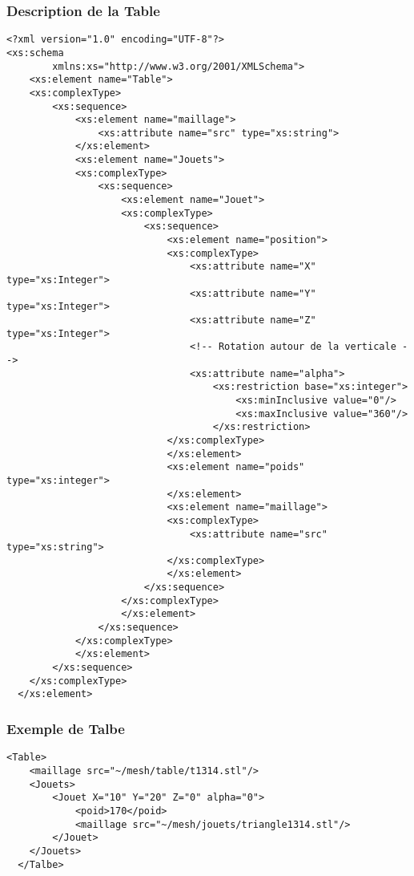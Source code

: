 \subsubsection{Description de la Table}
 \begin{lstlisting}[caption=Description de la Table, label=desctable]
<?xml version="1.0" encoding="UTF-8"?>
<xs:schema
        xmlns:xs="http://www.w3.org/2001/XMLSchema">
    <xs:element name="Table">
    <xs:complexType>
        <xs:sequence>
            <xs:element name="maillage">
                <xs:attribute name="src" type="xs:string">
            </xs:element>
            <xs:element name="Jouets">
            <xs:complexType>
                <xs:sequence>
                    <xs:element name="Jouet">
                    <xs:complexType>
                        <xs:sequence>
                            <xs:element name="position">
                            <xs:complexType>
                                <xs:attribute name="X" type="xs:Integer">
                                <xs:attribute name="Y" type="xs:Integer">
                                <xs:attribute name="Z" type="xs:Integer"> 
                                <!-- Rotation autour de la verticale -->
                                <xs:attribute name="alpha">
                                    <xs:restriction base="xs:integer">
                                        <xs:minInclusive value="0"/>
                                        <xs:maxInclusive value="360"/>
                                    </xs:restriction> 
                            </xs:complexType>
                            </xs:element>
                            <xs:element name="poids" type="xs:integer">
                            </xs:element>
                            <xs:element name="maillage">
                            <xs:complexType>
                                <xs:attribute name="src" type="xs:string">
                            </xs:complexType>
                            </xs:element>
                        </xs:sequence>
                    </xs:complexType>
                    </xs:element>
                </xs:sequence>
            </xs:complexType>
            </xs:element>
        </xs:sequence>
    </xs:complexType>
  </xs:element>
  \end{lstlisting}
  
\subsubsection{Exemple de Talbe}
  \begin{lstlisting}[caption=Description de la Table, label=desctable]
  <Table>
	<maillage src="~/mesh/table/t1314.stl"/>
	<Jouets>
		<Jouet X="10" Y="20" Z="0" alpha="0">
			<poid>170</poid>
			<maillage src="~/mesh/jouets/triangle1314.stl"/>
		</Jouet>
	</Jouets>
  </Talbe>
  \end{lstlisting}
